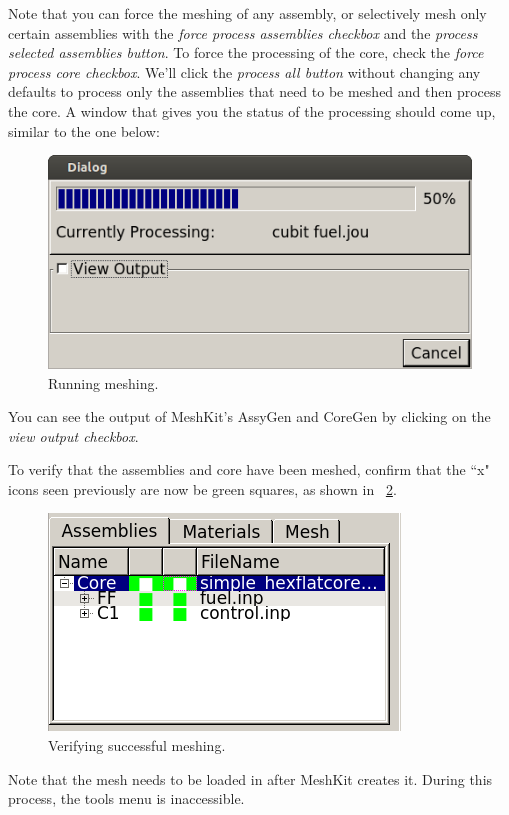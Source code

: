 Note that you can force the meshing of any assembly, or selectively mesh only certain assemblies with the \emph{force process assemblies checkbox} and the \emph{process selected assemblies button}.  To force the processing of the core, check the \emph{force process core checkbox}.  We'll click the \emph{process all button} without changing any defaults to process only the assemblies that need to be meshed and then process the core.  A window that gives you the status of the processing should come up, similar to the one below:

\begin{figure}[H]
	\begin{center}
		\includegraphics[width=0.5\linewidth]{Images/mesh-5.png}
		\caption{Running meshing.}
		\label{fig:Mesh5}
	\end{center}
\end{figure}

You can see the output of MeshKit's AssyGen and CoreGen by clicking on the \emph{view output checkbox}.

To verify that the assemblies and core have been meshed, confirm that the ``x" icons seen previously are now be green squares, as shown in ~\ref{fig:Mesh6}.

\begin{figure}[H]
	\begin{center}
		\includegraphics[width=0.5\linewidth]{Images/mesh-6.png}
		\caption{Verifying successful meshing.}
		\label{fig:Mesh6}
	\end{center}
\end{figure}

Note that the mesh needs to be loaded in after MeshKit creates it.  During this process, the tools menu is inaccessible.